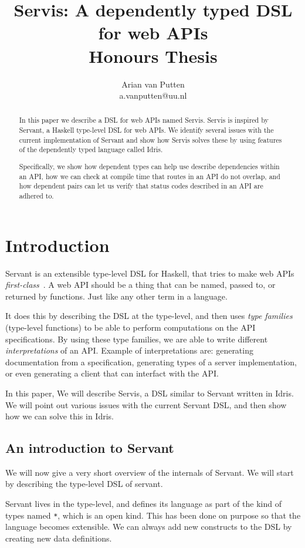 \documentclass[12pt,a4paper]{article}
\author{Arian van Putten \\ a.vanputten@uu.nl}
\title{Servis: A dependently typed DSL for web APIs\\
\large Honours Thesis}
\begin{document}
\maketitle
\begin{abstract}
In this paper we describe a DSL for web APIs named Servis. Servis is  inspired by Servant, a Haskell type-level DSL for web APIs. We identify several issues with the current implementation of Servant and show how Servis solves these by using features of the dependently typed language called Idris.

Specifically, we show how dependent types can help use describe dependencies within an API, how we can check at  compile time that routes in an API do not overlap, and how dependent pairs can let us verify that status codes described in an API are adhered to.

\end{abstract}

\section{Introduction}
Servant is an extensible type-level DSL for Haskell, that tries to make web APIs \emph{first-class}~\cite{servant}. A web API should be a thing that can be named, passed to, or returned by functions. Just like any other term in a language.

It does this by describing the DSL at the type-level, and then uses \emph{type families} (type-level functions) to be able to perform computations on the API specifications.  By using these type families, we are able to write different \emph{interpretations} of an API\@.  Example of interpretations are: generating documentation from a specification, generating types of a server implementation, or even generating a client that can interfact with the API\@.

In this paper, We will describe Servis, a DSL  similar to  Servant written in Idris. We will point out various issues with the current Servant DSL,
and then show how we can solve this in Idris.

\subsection{An introduction to Servant}
\label{sec:servant_intro}
We will now give a very short overview of the internals of Servant. We will start by describing the type-level DSL of servant.

Servant lives in the type-level, and defines its language as part of the kind of types named \texttt{*}, which is an open kind. This has been done on purpose so that the language becomes extensible. We can always add new constructs to the DSL by creating new data definitions.
\end{document}
